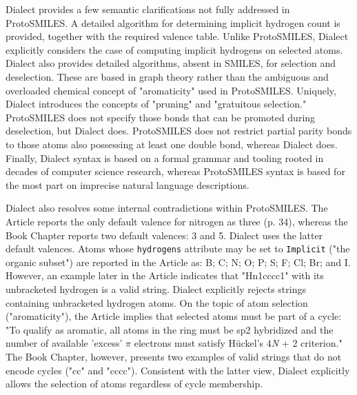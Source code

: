 \documentclass{article}
\def\ttt{\texttt}
\begin{document}
Dialect provides a few semantic clarifications not fully addressed in ProtoSMILES. A detailed algorithm for determining implicit hydrogen count is provided, together with the required valence table. Unlike ProtoSMILES, Dialect explicitly considers the case of computing implicit hydrogens on selected atoms. Dialect also provides detailed algorithms, absent in SMILES, for selection and deselection. These are based in graph theory rather than the ambiguous and overloaded chemical concept of "aromaticity" used in ProtoSMILES. Uniquely, Dialect introduces the concepts of "pruning" and "gratuitous selection." ProtoSMILES does not specify those bonds that can be promoted during deselection, but Dialect does. ProtoSMILES does not restrict partial parity bonds to those atoms also possessing at least one double bond, whereas Dialect does. Finally, Dialect syntax is based on a formal grammar and tooling rooted in decades of computer science research, whereas ProtoSMILES syntax is based for the most part on imprecise natural language descriptions.

Dialect also resolves some internal contradictions within ProtoSMILES. The Article reports the only default valence for nitrogen as three (p. 34),\cite[p 34]{weininger:1988} whereas the Book Chapter reports two default valences: 3 and 5.\cite[p 84]{weininger:2008} Dialect uses the latter default valences. Atoms whose \ttt{hydrogens} attribute may be set to \ttt{Implicit} ("the organic subset") are reported in the Article as: B; C; N; O; P; S; F; Cl; Br; and I.\cite[p 32]{weininger:2008} However, an example later in the Article indicates that "Hn1cccc1" with its unbracketed hydrogen is a valid string.\cite[p 35]{weininger:1988} Dialect explicitly rejects strings containing unbracketed hydrogen atoms. On the topic of atom selection ("aromaticity"), the Article implies that selected atoms must be part of a cycle: "To qualify as aromatic, all atoms in the ring must be sp2 hybridized and the number of available 'excess' $\pi$ electrons must satisfy Hückel's 4{\textit{N}} + 2 criterion."\cite[p 34]{weininger:1988} The Book Chapter, however, presents two examples of valid strings that do not encode cycles ("cc" and "cccc").\cite[p 85]{weininger:2008} Consistent with the latter view, Dialect explicitly allows the selection of atoms regardless of cycle membership.
\end{document}
